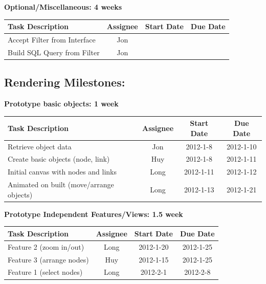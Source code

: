 \documentclass[12pt, letterpaper]{article}
\begin{document}
  \begin{center}
		{\bf Optional/Miscellaneous: 4 weeks}
    \begin{tabular}{| p{8.3cm} || c | c | c | }
      \hline
      Task Description & Assignee & Start Date & Due Date \\
      \hline
	    Accept Filter from Interface & Jon & & \\
	    Build SQL Query from Filter & Jon & & \\
      \hline
    \end{tabular}
  \end{center}
  
\subsection{Rendering Milestones:}

  \begin{center}
		{\bf Prototype basic objects: 1 week}
    \begin{tabular}{| p{8.3cm} || c | c | c | }
      \hline
      Task Description & Assignee & Start Date & Due Date \\
      \hline
			Retrieve object data & Jon & 2012-1-8 & 2012-1-10 \\
	    Create basic objects (node, link)& Huy & 2012-1-8 & 2012-1-11 \\
			Initial canvas with nodes and links & Long & 2012-1-11 & 2012-1-12 \\
	    Animated on built (move/arrange objects) & Long & 2012-1-13 & 2012-1-21 \\
      \hline
    \end{tabular}
  \end{center}

\begin{center}
		{\bf Prototype Independent Features/Views: 1.5 week}
    \begin{tabular}{| p{8.3cm} || c | c | c | }
      \hline
      Task Description & Assignee & Start Date & Due Date \\
      \hline
	    Feature 2 (zoom in/out)  & Long & 2012-1-20 & 2012-1-25 \\
	    Feature 3 (arrange nodes)  & Huy & 2012-1-15 & 2012-1-25 \\
		Feature 1 (select nodes) & Long & 2012-2-1 & 2012-2-8 \\
      \hline
    \end{tabular}
  \end{center}
\end{document}
